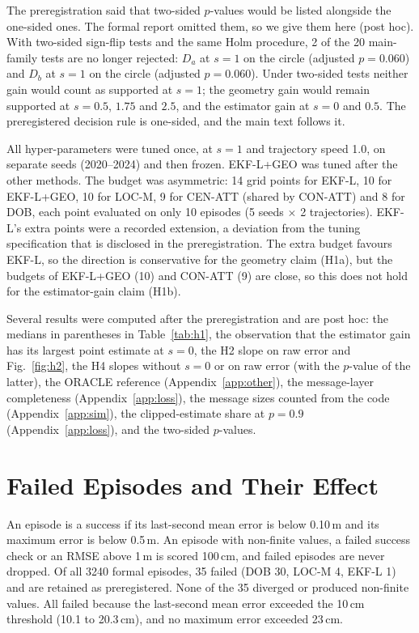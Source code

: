 \documentclass[conference]{IEEEtran}
\begin{document}
The preregistration said that two-sided $p$-values would be listed alongside the one-sided ones. The formal report omitted them, so we give them here (post hoc). With two-sided sign-flip tests and the same Holm procedure, 2 of the 20 main-family tests are no longer rejected: $D_a$ at $s{=}1$ on the circle (adjusted $p=0.060$) and $D_b$ at $s{=}1$ on the circle (adjusted $p=0.060$). Under two-sided tests neither gain would count as supported at $s{=}1$; the geometry gain would remain supported at $s=0.5$, $1.75$ and $2.5$, and the estimator gain at $s=0$ and $0.5$. The preregistered decision rule is one-sided, and the main text follows it.

All hyper-parameters were tuned once, at $s{=}1$ and trajectory speed 1.0, on separate seeds (2020--2024) and then frozen. EKF-L+GEO was tuned after the other methods. The budget was asymmetric: 14 grid points for EKF-L, 10 for EKF-L+GEO, 10 for LOC-M, 9 for CEN-ATT (shared by CON-ATT) and 8 for DOB, each point evaluated on only 10 episodes (5 seeds $\times$ 2 trajectories). EKF-L's extra points were a recorded extension, a deviation from the tuning specification that is disclosed in the preregistration. The extra budget favours EKF-L, so the direction is conservative for the geometry claim (H1a), but the budgets of EKF-L+GEO (10) and CON-ATT (9) are close, so this does not hold for the estimator-gain claim (H1b).

Several results were computed after the preregistration and are post hoc: the medians in parentheses in Table~\ref{tab:h1}, the observation that the estimator gain has its largest point estimate at $s{=}0$, the H2 slope on raw error and Fig.~\ref{fig:h2}, the H4 slopes without $s{=}0$ or on raw error (with the $p$-value of the latter), the ORACLE reference (Appendix~\ref{app:other}), the message-layer completeness (Appendix~\ref{app:loss}), the message sizes counted from the code (Appendix~\ref{app:sim}), the clipped-estimate share at $p=0.9$ (Appendix~\ref{app:loss}), and the two-sided $p$-values.

\section{Failed Episodes and Their Effect}\label{app:fail}
An episode is a success if its last-second mean error is below 0.10\,m and its maximum error is below 0.5\,m. An episode with non-finite values, a failed success check or an RMSE above 1\,m is scored 100\,cm, and failed episodes are never dropped. Of all 3240 formal episodes, 35 failed (DOB 30, LOC-M 4, EKF-L 1) and are retained as preregistered. None of the 35 diverged or produced non-finite values. All failed because the last-second mean error exceeded the 10\,cm threshold (10.1 to 20.3\,cm), and no maximum error exceeded 23\,cm.
\end{document}
